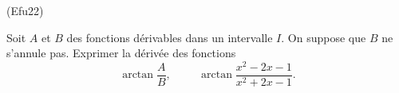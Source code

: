 \begin{tiny}(Efu22)\end{tiny} Soit $A$ et $B$ des fonctions dérivables dans un intervalle $I$. On suppose que $B$ ne s'annule pas. Exprimer la dérivée des fonctions
\begin{displaymath}
  \arctan \frac{A}{B} ,\hspace{1cm} \arctan\frac{x^2-2x-1}{x^2+2x-1}.
\end{displaymath}
